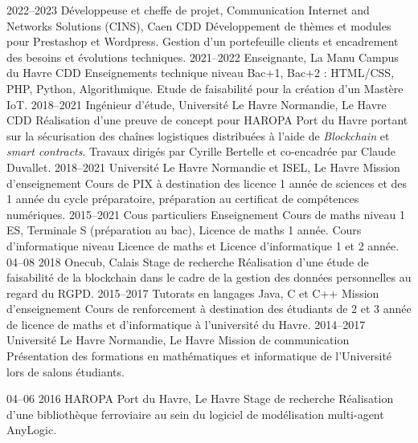 \documentclass[]{cv-style}          %
\begin{document}
\begin{entrylist}
\entry
  {2022--2023}
  {Développeuse et cheffe de projet, Communication Internet and Networks Solutions (CINS), Caen}
  {CDD}
  {Développement de thèmes et modules pour Prestashop et Wordpress. Gestion d'un portefeuille clients et encadrement des besoins et évolutions techniques.}
\entry
  {2021--2022}
  {Enseignante, La Manu Campus du Havre}
  {CDD}
  {Enseignements technique niveau Bac+1, Bac+2 : HTML/CSS, PHP, Python, Algorithmique. Etude de faisabilité pour la création d'un Mastère IoT.}
\entry
  {2018--2021}
  {Ingénieur d'étude, Université Le Havre Normandie, Le Havre}
  {CDD}
  {Réalisation d'une preuve de concept pour HAROPA Port du Havre portant sur la sécurisation des chaînes logistiques distribuées à l'aide de \textit{Blockchain} et \textit{smart contracts}. Travaux dirigés par Cyrille Bertelle et co-encadrée par Claude Duvallet.}
\entry
  {2018--2021}
  {Université Le Havre Normandie et ISEL, Le Havre}
  {Mission d'enseignement}
  {Cours de PIX à destination des licence 1 année de sciences et des 1 année du cycle préparatoire, préparation au certificat de compétences numériques.}
\entry
  {2015--2021}
  {Cous particuliers}
  {Enseignement}
  {Cours de maths niveau 1 ES, Terminale S (préparation au bac), Licence de maths 1 année. Cours d’informatique niveau Licence de maths et Licence d’informatique 1 et 2 année.}
\entry
  {04--08 2018}
  {Onecub, Calais}
  {Stage de recherche}
  {Réalisation d’une étude de faisabilité de la blockchain dans le cadre de la gestion des données personnelles au regard du RGPD.}
\entry
  {2015--2017}
  {Tutorats en langages Java, C et C++}
  {Mission d'enseignement}
  {Cours de renforcement à destination des étudiants de 2 et 3 année de licence de maths et d’informatique à l’université du Havre.}
\entry
  {2014--2017}
  {Université Le Havre Normandie, Le Havre}
  {Mission de communication}
  {Présentation des formations en mathématiques et informatique de l’Université lors de salons étudiants.}

\entry
  {04--06 2016}
  {HAROPA Port du Havre, Le Havre}
  {Stage de recherche}
  {Réalisation d’une bibliothèque ferroviaire au sein du logiciel de modélisation multi-agent AnyLogic.}
\end{entrylist}
\end{document}
